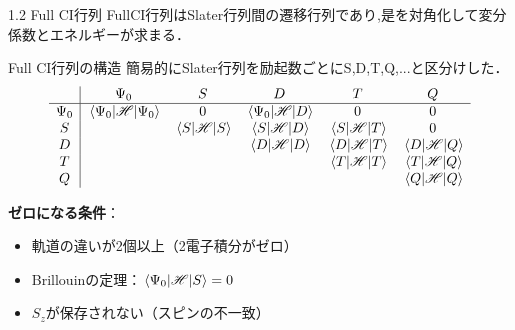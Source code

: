 \documentclass{beamer}
\begin{document}
  \begin{frame}{1.2 Full CI行列}
  FullCI行列はSlater行列間の遷移行列であり,是を対角化して変分係数とエネルギーが求まる．　
  \begin{block}{Full CI行列の構造}
  簡易的にSlater行列を励起数ごとにS,D,T,Q,...と区分けした．
  \[ 
\begin{array}{c|ccccc}
  & \Psi_0 & S & D & T & Q \\ \hline
\Psi_0 & \mel{\Psi_0}{\mathscr{H}}{\Psi_0} & 0 & \mel{\Psi_0}{\mathscr{H}}{D} & 0 & 0 \\
S      &        & \mel{S}{\mathscr{H}}{S} & \mel{S}{\mathscr{H}}{D} & \mel{S}{\mathscr{H}}{T} & 0 \\
D      &        &         & \mel{D}{\mathscr{H}}{D} & \mel{D}{\mathscr{H}}{T} & \mel{D}{\mathscr{H}}{Q} \\
T      &        &         &         & \mel{T}{\mathscr{H}}{T} & \mel{T}{\mathscr{H}}{Q} \\
Q      &        &         &         &         & \mel{Q}{\mathscr{H}}{Q} \\
\end{array}
\]
\end{block}
\textbf{ゼロになる条件}：
  \begin{itemize}
    \item 軌道の違いが2個以上（2電子積分がゼロ）
    \item Brillouinの定理：$\mel{\Psi_0}{\mathscr{H}}{S} = 0$
    \item $S_z$が保存されない（スピンの不一致）
  \end{itemize}
\end{frame}
  
\end{document}
